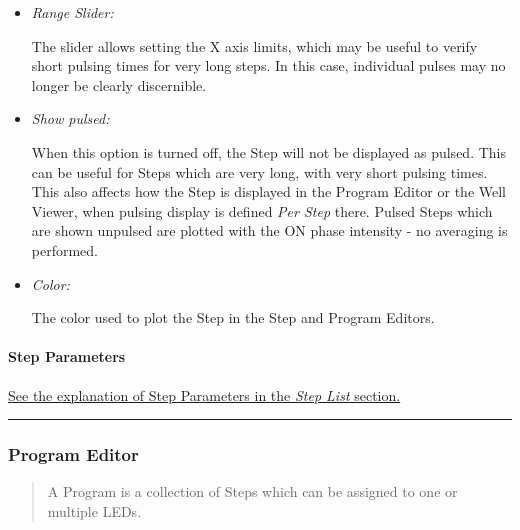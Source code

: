 \begin{itemize}
\item
  \emph{Range Slider:}

  The slider allows setting the X axis limits, which may be useful to
  verify short pulsing times for very long steps. In this case,
  individual pulses may no longer be clearly discernible.
\item
  \emph{Show pulsed:}

  When this option is turned off, the Step will not be displayed as
  pulsed. This can be useful for Steps which are very long, with very
  short pulsing times. This also affects how the Step is displayed in
  the Program Editor or the Well Viewer, when pulsing display is defined
  \emph{Per Step} there. Pulsed Steps which are shown unpulsed are
  plotted with the ON phase intensity - no averaging is performed.
\item
  \emph{Color:}

  The color used to plot the Step in the Step and Program Editors.
\end{itemize}

\hypertarget{step-parameters-1}{%
\paragraph{Step Parameters}\label{step-parameters-1}}

\protect\hyperlink{step-parameters}{See the explanation of Step
Parameters in the \emph{Step List} section.}

\begin{center}\rule{0.5\linewidth}{0.5pt}\end{center}

\hypertarget{program-editor}{%
\subsubsection{Program Editor}\label{program-editor}}

\begin{quote}
A Program is a collection of Steps which can be assigned to one or
multiple LEDs.
\end{quote}

